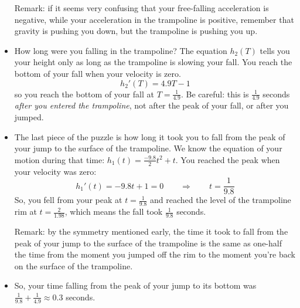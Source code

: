 \begin{solution}
\begin{itemize}
Remark: if it seems very confusing that your free-falling acceleration is negative, while your acceleration in the trampoline is positive, remember that gravity is pushing you down, but the trampoline is pushing you up.
\item How long were  you falling in the trampoline? The equation $h_2(T)$ tells you your height only as long as the trampoline is slowing your fall. You reach the bottom of your fall when your velocity is zero.
\[h_2'(T)=4.9T-1\]
so you reach the bottom of your fall at $T=\frac{1}{4.9}$. Be careful: this is $\frac{1}{4.9}$ seconds \emph{after you entered the trampoline}, not after the peak of your fall, or after you jumped.
\item The last piece of the puzzle is how long it took you to fall from the peak of your jump to the surface of the trampoline. We know the equation of your motion during that time: $h_1(t)=\frac{-9.8}{2}t^2+t$. You reached the peak when your velocity was zero:
\[h_1'(t)=-9.8t+1 =0\qquad\Rightarrow\qquad t=\frac{1}{9.8}\]
So, you fell from your peak at $t=\frac{1}{9.8}$ and reached the level of the trampoline rim at $t=\frac{2}{1.98}$, which means the fall took $\frac{1}{9.8}$ seconds.

Remark: by the symmetry mentioned early, the time it took to fall from the peak of your jump to the surface of the trampoline is the same as one-half the time from the moment you jumped off the rim to the moment you're back on the surface of the trampoline.
\item So, your time falling from the peak of your jump to its bottom was $\frac{1}{9.8}+\frac{1}{4.9}\approx 0.3$ seconds.
\end{itemize}
\end{solution}



